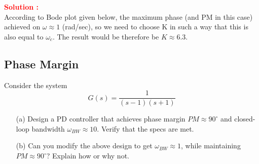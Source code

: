 \documentclass[12pt]{article}
\begin{document}
\textbf{\textcolor{red}{Solution :}} \\
According to Bode plot given below, the maximum phase (and PM in this case) achieved on $\omega\approx 1$ (rad/sec), so we need to choose K in such a way that this is also equal to $\omega_c$. The result would be therefore be $K \approx 6.3$.
\clearpage

\subsection{Phase Margin}
Consider the system 
\[
G(s)=\frac{1}{(s - 1)(s+1)}
\]
\begin{itemize}
    \item [(a)] Design a PD controller that achieves phase margin $PM \approx 90^\circ$ and closed-loop bandwidth $\omega_{BW} \approx 10$. Verify that the specs are met.
    \item[(b)] Can you modify the above design to get $\omega_{BW} \approx 1$, while maintaining $PM \approx 90^\circ$? Explain how or why not.
\end{itemize}
\end{document}
